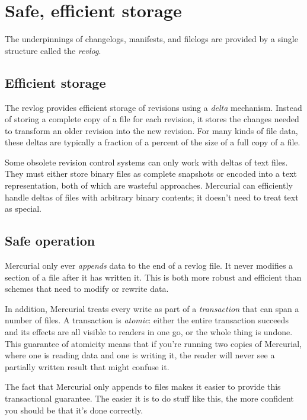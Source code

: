 \section{Safe, efficient storage}

The underpinnings of changelogs, manifests, and filelogs are provided
by a single structure called the \emph{revlog}.

\subsection{Efficient storage}

The revlog provides efficient storage of revisions using a
\emph{delta} mechanism.  Instead of storing a complete copy of a file
for each revision, it stores the changes needed to transform an older
revision into the new revision.  For many kinds of file data, these
deltas are typically a fraction of a percent of the size of a full
copy of a file.

Some obsolete revision control systems can only work with deltas of
text files.  They must either store binary files as complete snapshots
or encoded into a text representation, both of which are wasteful
approaches.  Mercurial can efficiently handle deltas of files with
arbitrary binary contents; it doesn't need to treat text as special.

\subsection{Safe operation}

Mercurial only ever \emph{appends} data to the end of a revlog file.
It never modifies a section of a file after it has written it.  This
is both more robust and efficient than schemes that need to modify or
rewrite data.

In addition, Mercurial treats every write as part of a
\emph{transaction} that can span a number of files.  A transaction is
\emph{atomic}: either the entire transaction succeeds and its effects
are all visible to readers in one go, or the whole thing is undone.
This guarantee of atomicity means that if you're running two copies of
Mercurial, where one is reading data and one is writing it, the reader
will never see a partially written result that might confuse it.

The fact that Mercurial only appends to files makes it easier to
provide this transactional guarantee.  The easier it is to do stuff
like this, the more confident you should be that it's done correctly.

